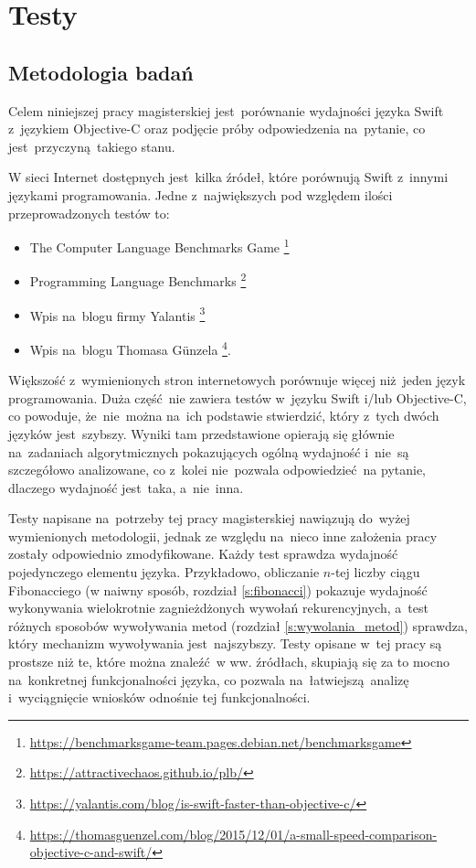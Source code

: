 \documentclass[mgr, shortabstract]{iithesis}
\begin{document}
\chapter{Testy}
\label{ch:testy}

\section{Metodologia badań}

Celem niniejszej pracy magisterskiej jest~porównanie wydajności języka Swift z~językiem Objective-C oraz podjęcie próby odpowiedzenia na~pytanie, co jest~przyczyną takiego stanu.

W sieci Internet dostępnych jest~kilka źródeł, które porównują Swift z~innymi językami programowania. Jedne z~największych pod względem ilości przeprowadzonych testów to:
\begin{itemize}
    \item The Computer Language Benchmarks Game \footnote{\url{https://benchmarksgame-team.pages.debian.net/benchmarksgame}}
    \item Programming Language Benchmarks \footnote{\url{https://attractivechaos.github.io/plb/}}
    \item Wpis na~blogu firmy Yalantis \footnote{\url{https://yalantis.com/blog/is-swift-faster-than-objective-c/}}
    \item Wpis na~blogu Thomasa Günzela \footnote{\url{https://thomasguenzel.com/blog/2015/12/01/a-small-speed-comparison-objective-c-and-swift/}}.
\end{itemize}

Większość z~wymienionych stron internetowych porównuje więcej niż jeden język programowania. Duża część nie zawiera testów w~języku Swift i/lub Objective-C, co powoduje, że~nie~można na~ich podstawie stwierdzić, który z~tych dwóch języków jest~szybszy. Wyniki tam przedstawione opierają się głównie na~zadaniach algorytmicznych pokazujących ogólną wydajność i~nie~są szczegółowo analizowane, co z~kolei nie~pozwala odpowiedzieć na pytanie, dlaczego wydajność jest~taka, a~nie~inna. 

Testy napisane na~potrzeby tej pracy magisterskiej nawiązują do~wyżej wymienionych metodologii, jednak ze względu na~nieco inne założenia pracy zostały odpowiednio zmodyfikowane. Każdy test sprawdza wydajność pojedynczego elementu języka. Przykładowo, obliczanie $n$-tej liczby ciągu Fibonacciego (w naiwny sposób, rozdział \ref{s:fibonacci}) pokazuje wydajność wykonywania wielokrotnie zagnieżdżonych wywołań rekurencyjnych, a~test różnych sposobów wywoływania metod (rozdział \ref{s:wywolania_metod}) sprawdza, który mechanizm wywoływania jest~najszybszy. Testy opisane w~tej pracy są prostsze niż te, które można znaleźć w ww. źródłach, skupiają się za to mocno na~konkretnej funkcjonalności języka, co pozwala na~łatwiejszą analizę i~wyciągnięcie wniosków odnośnie tej funkcjonalności.
\end{document}
